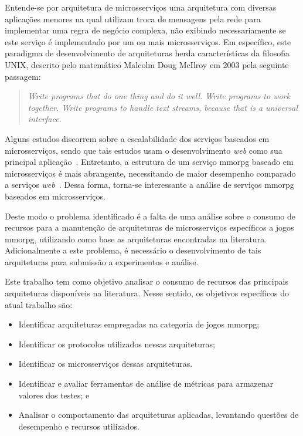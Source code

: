 Entende-se por arquitetura de microsserviços uma arquitetura com diversas aplicações menores na qual utilizam troca de mensagens pela rede  para implementar uma regra de negócio complexa, não exibindo necessariamente se este serviço é implementado por um ou mais microsserviços.
%
Em específico, este paradigma de desenvolvimento de arquiteturas herda características da filosofia UNIX, descrito pelo matemático Malcolm Doug McIlroy em 2003 pela seguinte passagem:

\begin{quotation}
    \textit{Write programs that do one thing and do it well. Write programs to work together. Write programs to handle text streams, because that is a universal interface.}\\
    \cite{Raymond2003Oct}
\end{quotation}

Alguns estudos discorrem sobre a escalabilidade dos serviços baseados em microsserviços, sendo que tais estudos usam o desenvolvimento \textit{web} como sua principal aplicação~\cite{photon_engine, mmorpg_culture, DiFrancesco2017Apr}.
%
Entretanto, a estrutura de um serviço \ac{mmorpg} baseado em microsserviços é mais abrangente, necessitando de maior desempenho comparado a serviços \textit{web}~\cite{photon_engine, mmorpg_culture}.
%
Dessa forma, torna-se interessante a análise de serviços \ac{mmorpg} baseados em microsserviços.


Deste modo o problema identificado é a falta de uma análise sobre o consumo de recursos para a manutenção de arquiteturas de microsserviços específicos a jogos \ac{mmorpg}, utilizando como base as arquiteturas encontradas na literatura.
%
Adicionalmente a este problema, é necessário o desenvolvimento de tais arquiteturas para submissão a experimentos e análise.

Este trabalho tem como objetivo analisar o consumo de recursos das principais arquiteturas disponíveis na literatura.
%
Nesse sentido, os objetivos específicos do atual trabalho são:

\begin{itemize}
    \item Identificar arquiteturas empregadas na categoria de jogos \ac{mmorpg};
    \item Identificar os protocolos utilizados nessas arquiteturas;
    \item Identificar os microsserviços dessas arquiteturas.
    \item Identificar e avaliar ferramentas de análise de métricas para armazenar valores dos testes; e
    \item Analisar o comportamento das arquiteturas aplicadas, levantando questões de desempenho e recursos utilizados.
\end{itemize}


